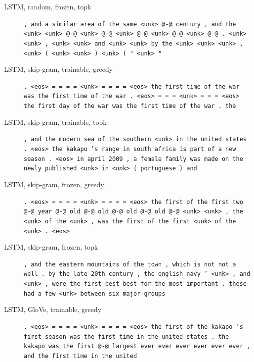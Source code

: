\begin{description}
\item[LSTM, random, frozen, topk] \texttt{\small , and a similar area of the same \textless{}unk\textgreater{} @-@ century , and the \textless{}unk\textgreater{} \textless{}unk\textgreater{} @-@ \textless{}unk\textgreater{} @-@ \textless{}unk\textgreater{} @-@ \textless{}unk\textgreater{} @-@ \textless{}unk\textgreater{} @-@ . \textless{}unk\textgreater{} \textless{}unk\textgreater{} , \textless{}unk\textgreater{} \textless{}unk\textgreater{} and \textless{}unk\textgreater{} \textless{}unk\textgreater{} by the \textless{}unk\textgreater{} \textless{}unk\textgreater{} \textless{}unk\textgreater{} , \textless{}unk\textgreater{} ( \textless{}unk\textgreater{} \textless{}unk\textgreater{} ) \textless{}unk\textgreater{} ( " \textless{}unk\textgreater{} "}
\item[LSTM, skip-gram, trainable, greedy] \texttt{\small . \textless{}eos\textgreater{} = = = = \textless{}unk\textgreater{} = = = = \textless{}eos\textgreater{} the first time of the war was the first time of the war . \textless{}eos\textgreater{} = = = \textless{}unk\textgreater{} = = = \textless{}eos\textgreater{} the first day of the war was the first time of the war . the}
\item[LSTM, skip-gram, trainable, topk] \texttt{\small , and the modern sea of the southern \textless{}unk\textgreater{} in the united states . \textless{}eos\textgreater{} the kakapo 's range in south africa is part of a new season . \textless{}eos\textgreater{} in april 2009 , a female family was made on the newly published \textless{}unk\textgreater{} in \textless{}unk\textgreater{} ( portuguese ) and}
\item[LSTM, skip-gram, frozen, greedy] \texttt{\small . \textless{}eos\textgreater{} = = = = \textless{}unk\textgreater{} = = = = \textless{}eos\textgreater{} the first of the first two @-@ year @-@ old @-@ old @-@ old @-@ old @-@ \textless{}unk\textgreater{} \textless{}unk\textgreater{} , the \textless{}unk\textgreater{} of the \textless{}unk\textgreater{} , was the first of the first \textless{}unk\textgreater{} of the \textless{}unk\textgreater{} . \textless{}eos\textgreater{}}
\item[LSTM, skip-gram, frozen, topk] \texttt{\small , and the eastern mountains of the town , which is not not a well . by the late 20th century , the english navy ' \textless{}unk\textgreater{} , and \textless{}unk\textgreater{} , were the first best best for the most important . these had a few \textless{}unk\textgreater{} between six major groups}
\item[LSTM, GloVe, trainable, greedy] \texttt{\small . \textless{}eos\textgreater{} = = = = \textless{}unk\textgreater{} = = = = \textless{}eos\textgreater{} the first of the kakapo 's first season was the first time in the united states . the kakapo was the first @-@ largest ever ever ever ever ever ever , and the first time in the united}

\end{description}

